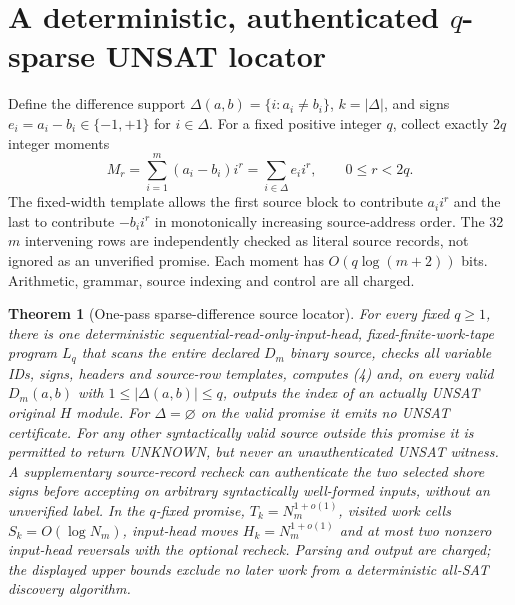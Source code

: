 \documentclass[11pt]{article}
\newtheorem{theorem}{Theorem}
\begin{document}
\section{A deterministic, authenticated $q$-sparse UNSAT locator}
Define the difference support $\Delta(a,b)=\{i:a_i\ne b_i\}$, $k=|\Delta|$, and signs $e_i=a_i-b_i\in\{-1,+1\}$ for $i\in\Delta$. For a fixed positive integer $q$, collect exactly $2q$ integer moments
\[
 M_r=\sum_{i=1}^m(a_i-b_i)i^r=\sum_{i\in\Delta}e_i i^r,
 \qquad 0\le r<2q.\tag{4}
\]
The fixed-width template allows the first source block to contribute $a_i i^r$ and the last to contribute $-b_i i^r$ in monotonically increasing source-address order. The 32$m$ intervening rows are independently checked as literal source records, not ignored as an unverified promise. Each moment has $O(q\log(m+2))$ bits. Arithmetic, grammar, source indexing and control are all charged.
\begin{theorem}[One-pass sparse-difference source locator]\label{th:locator}
For every \emph{fixed} $q\ge1$, there is one deterministic sequential-read-only-input-head, fixed-finite-work-tape program $L_q$ that scans the entire declared $D_m$ binary source, checks all variable IDs, signs, headers and source-row templates, computes (4) and, on every valid $D_m(a,b)$ with $1\le|\Delta(a,b)|\le q$, outputs the index of an actually UNSAT original $H$ module. For $\Delta=\varnothing$ on the valid promise it emits no UNSAT certificate. For any other syntactically valid source outside this promise it is permitted to return \textsf{UNKNOWN}, but never an unauthenticated UNSAT witness. A supplementary source-record recheck can authenticate the two selected shore signs before accepting on arbitrary syntactically well-formed inputs, without an unverified label. In the $q$-fixed promise, $T_k=N_m^{1+o(1)}$, visited work cells $S_k=O(\log N_m)$, input-head moves $H_k=N_m^{1+o(1)}$ and at most two nonzero input-head reversals with the optional recheck. Parsing and output are charged; the displayed upper bounds exclude no later work from a deterministic all-SAT discovery algorithm.
\end{theorem}
\end{document}
